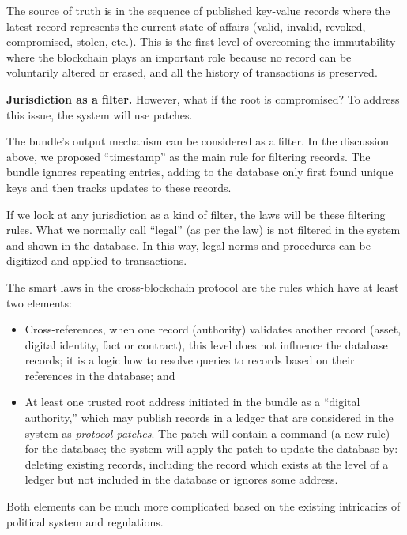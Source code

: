 \begin{multicols}{2}
The source of truth is in the sequence of published key-value records where the latest record represents the current state of affairs (valid, invalid, revoked, compromised, stolen, etc.). This is the first level of overcoming the immutability where the blockchain plays an important role because no record can be voluntarily altered or erased, and all the history of transactions is preserved.

\textbf{Jurisdiction as a filter.} However, what if the root is compromised? To address this issue, the system will use patches.

The bundle’s output mechanism can be considered as a filter. In the discussion above, we proposed “timestamp” as the main rule for filtering records. The bundle ignores repeating entries, adding to the database only first found unique keys and then tracks updates to these records.

If we look at any jurisdiction as a kind of filter, the laws will be these filtering rules. What we normally call “legal” (as per the law) is not filtered in the system and shown in the database. In this way, legal norms and procedures can be digitized and applied to transactions.

The smart laws in the cross-blockchain protocol are the rules which have at least two elements:
\begin{itemize}
\item[(1)] Cross-references, when one record (authority) validates another record (asset, digital identity, fact or contract), this level does not influence the database records; it is a logic how to resolve queries to records based on their references in the database; and
\item[(2)] At least one trusted root address initiated in the bundle as a “digital authority,” which may publish records in a ledger that are considered in the system as \textit{protocol patches}. The patch will contain a command (a new rule) for the database; the system will apply the patch to update the database by: deleting existing records, including the record which exists at the level of a ledger but not included in the database or ignores some address.
\end{itemize}

Both elements can be much more complicated based on the existing intricacies of political system and regulations.


\end{multicols}
